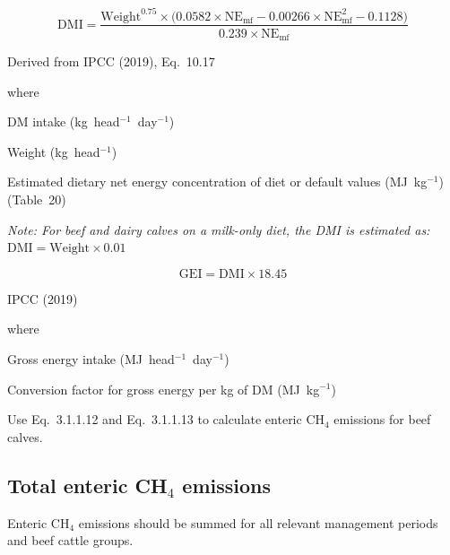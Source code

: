 \begin{equation}
    \mathrm{DMI} = \frac{\mathrm{Weight}^{0.75}
        \times \bigl(0.0582 \times \mathrm{NE}_{\mathrm{mf}}
            - 0.00266 \times \mathrm{NE}_{\mathrm{mf}}^{2}
            - 0.1128\bigr)}
        {0.239 \times \mathrm{NE}_{\mathrm{mf}}}
    \tag{Eq.\ 3.1.2.2}
\end{equation}

\noindent Derived from IPCC (2019), Eq.~10.17

\noindent where
\begin{description}[font=\normalfont, leftmargin=7em, style=sameline, nosep]
    \item[$\mathrm{DMI}$] DM intake (kg~head$^{-1}$~day$^{-1}$)
    \item[$\mathrm{Weight}$] Weight (kg~head$^{-1}$)
    \item[$\mathrm{NE}_{\mathrm{mf}}$] Estimated dietary net energy concentration of
          diet or default values (MJ~kg$^{-1}$) (Table~20)
\end{description}

\noindent\textit{Note: For beef and dairy calves on a milk-only diet, the DMI is
estimated as: $\mathrm{DMI} = \mathrm{Weight} \times 0.01$}

\begin{equation}
    \mathrm{GEI} = \mathrm{DMI} \times 18.45
    \tag{Eq.\ 3.1.2.3}
\end{equation}

\noindent IPCC (2019)

\noindent where
\begin{description}[font=\normalfont, leftmargin=6em, style=sameline, nosep]
    \item[$\mathrm{GEI}$] Gross energy intake (MJ~head$^{-1}$~day$^{-1}$)
    \item[$18.45$] Conversion factor for gross energy per kg of DM (MJ~kg$^{-1}$)
\end{description}

\noindent Use Eq.~3.1.1.12 and Eq.~3.1.1.13 to calculate enteric CH$_4$ emissions
for beef calves.

\subsection{Total enteric CH\texorpdfstring{$_4$}{4} emissions}
\label{subsec:beef-total}

Enteric CH$_4$ emissions should be summed for all relevant management periods and
beef cattle groups.

